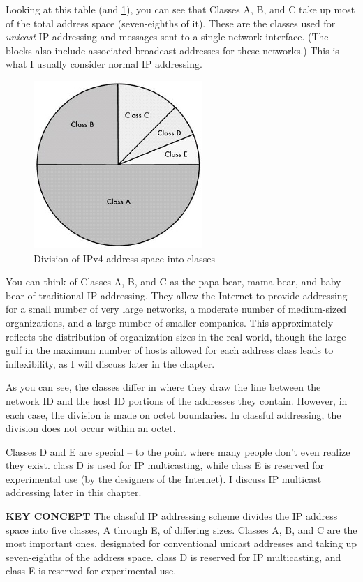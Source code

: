 \documentclass[b5paper,11pt]{memoir}
\begin{document}
Looking at this table (and \cref{fig:ipv4-classes}), you can see that Classes A, B, and C take up most of the total address space (seven-eighths of it).
These are the classes used for {\emph{unicast}} IP addressing and messages sent to a single network interface.
(The blocks also include associated broadcast addresses for these networks.)
This is what I usually consider normal IP addressing.


\begin{figure}
   \centering
   \includegraphics[width=.5\textwidth]{images/ipv4-classes.jpg}
   \caption{Division of IPv4 address space into classes}
   \label{fig:ipv4-classes}
\end{figure}

You can think of Classes A, B, and C as the papa bear, mama bear, and baby bear of traditional IP addressing.
They allow the Internet to provide addressing for a small number of very
large networks, a moderate number of medium-sized organizations, and a
large number of smaller companies. This approximately reflects the
distribution of organization sizes in the real world, though the large
gulf in the maximum number of hosts allowed for each address class leads
to inflexibility, as I will discuss later in the chapter.

As you can see, the classes differ in where they draw the line between
the network ID and the host ID portions of the addresses they contain.
However, in each case, the division is made on octet boundaries. In
classful addressing, the division does not occur within an octet.

Classes D and E are special -- to the point where many people don't even realize they exist.
class D is used for IP multicasting, while class E is reserved for experimental use (by the designers of the Internet).
I discuss IP multicast addressing later in this chapter.


{\textbf{KEY CONCEPT}} The classful IP addressing scheme divides the IP
address space into five classes, A through E, of differing sizes.
Classes A, B, and C are the most important ones, designated for
conventional unicast addresses and taking up seven-eighths of the
address space. class D is reserved for IP multicasting, and class E is
reserved for experimental use.
\end{document}
